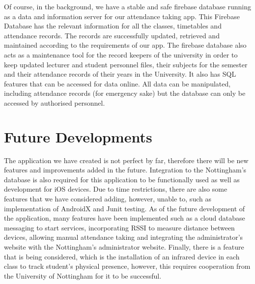 \documentclass[../report.tex]{subfiles}
\begin{document}
Of course, in the background, we have a stable and safe firebase database running as a data and information server for our attendance taking app. This Firebase Database has the relevant information for all the classes, timetables and attendance records. The records are successfully updated, retrieved and maintained according to the requirements of our app. The firebase database also acts as a maintenance tool for the record keepers of the university in order to keep updated lecturer and student personnel files, their subjects for the semester and their attendance records of their years in the University. It also has SQL features that can be accessed for data online. All data can be manipulated, including attendance records (for emergency sake) but the database can only be accessed by authorised personnel.

\section{Future Developments}
The application we have created is not perfect by far, therefore there will be new features and improvements added in the future. Integration to the Nottingham’s database is also required for this application to be functionally used as well as development for iOS devices. Due to time restrictions, there are also some features that we have considered adding, however, unable to, such as implementation of AndroidX and Junit testing. As of the future development of the application, many features have been implemented such as a cloud database messaging to start services, incorporating RSSI to measure distance between devices, allowing manual attendance taking and integrating the administrator’s website with the Nottingham’s administrator website. Finally, there is a feature that is being considered, which is the installation of an infrared device in each class to track student’s physical presence, however, this requires cooperation from the University of Nottingham for it to be successful.
\end{document}
